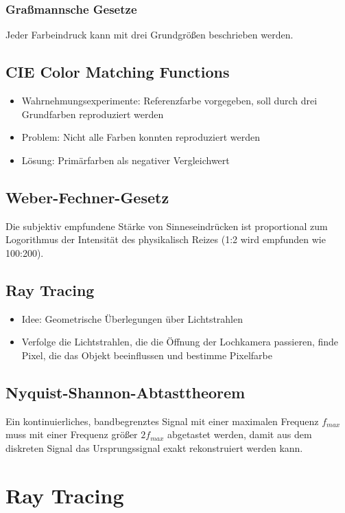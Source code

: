 \subsubsection{Graßmannsche Gesetze}
Jeder Farbeindruck kann mit drei Grundgrößen beschrieben werden.


\subsection{CIE Color Matching Functions}
\begin{itemize}
	\item Wahrnehmungsexperimente: Referenzfarbe vorgegeben, soll durch drei Grundfarben reproduziert werden
	\item Problem: Nicht alle Farben konnten reproduziert werden
	\item Lösung: Primärfarben als negativer Vergleichwert
\end{itemize}


\subsection{Weber-Fechner-Gesetz}
Die subjektiv empfundene Stärke von Sinneseindrücken ist proportional zum Logorithmus der Intensität des physikalisch Reizes (1:2 wird empfunden wie 100:200).


\subsection{Ray Tracing}
\begin{itemize}
	\item Idee: Geometrische Überlegungen über Lichtstrahlen
	\item Verfolge die Lichtstrahlen, die die Öffnung der Lochkamera passieren, finde Pixel, die das Objekt beeinflussen und bestimme Pixelfarbe
\end{itemize}


\subsection{Nyquist-Shannon-Abtasttheorem}
Ein kontinuierliches, bandbegrenztes Signal mit einer maximalen Frequenz \(f_{max}\) muss mit einer Frequenz größer \(2f_{max}\) abgetastet werden, damit aus dem diskreten Signal das Ursprungssignal exakt rekonstruiert werden kann.



\section{Ray Tracing}

